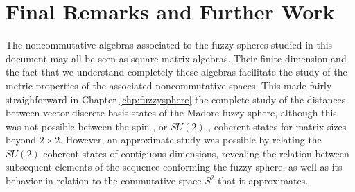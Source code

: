 \documentclass[12pt]{report}
\theoremstyle{definition}
\begin{document}
% 

\chapter{Final Remarks and Further Work}
 \label{chp:remarks}

The noncommutative algebras associated to the fuzzy spheres studied in this document may all be seen as square matrix algebras. Their finite dimension and the fact that we understand completely these algebras facilitate the study of the metric properties of the associated noncommutative spaces. This made fairly straighforward in Chapter \ref{chp:fuzzysphere} the complete study of the distances between vector discrete basis states of the Madore fuzzy sphere, although this was not possible between the spin-, or $SU(2)$-, coherent states for matrix sizes beyond $2 \times 2$. However, an approximate study was possible by relating the $SU(2)$-coherent states of contiguous dimensions, revealing the relation between subsequent elements of the sequence conforming the fuzzy sphere, as well as its behavior in relation to the commutative space $S^2$ that it approximates. 
\end{document}
